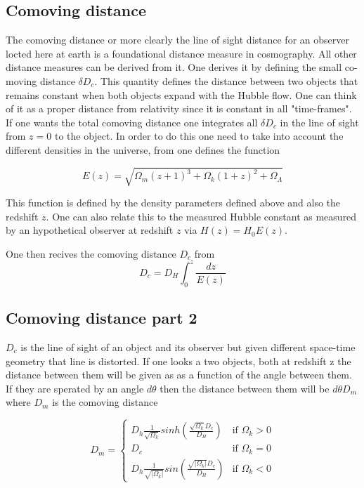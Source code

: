 \documentclass{article}
\begin{document}
\subsection{Comoving distance}
The comoving distance or more clearly the line of sight distance for an observer locted here
 at earth is a foundational distance measure in cosmography. All other distance measures can be 
 derived from it. One derives it by defining the small co-moving distance $\delta D_c$. 
 This quantity defines the distance between two objects that remains constant when both objects expand with the Hubble flow.
  One can think of it as a proper distance from relativity since it is constant in all "time-frames". 
  If one wants the total comoving distance one integrates all $\delta D_c$ in the line of sight from $z= 0$ to the object. 
In order to do this one need to take into account the different densities in the universe, from  \cite{hogg2000distance} one defines the function 

\begin{equation}
    E(z)  = \sqrt{\Omega_m(z+1)^3 +\Omega_k (1+z)^2 + \Omega_\Lambda  }
\end{equation}


This function is defined by the density parameters defined above and also the redshift $z$. 
One can also relate this to the measured Hubble constant as measured by an hypothetical observer at 
redshift $z$ via $ H(z) = H_0 E(z)$. 


One then recives the comoving distance $D_c$ from 
\begin{equation}
    D_c =D_H \int_0^z\frac{dz}{E(z)}
\end{equation}
\subsection{Comoving distance part 2}
$D_c$ is the line of sight of an object and its observer but given different space-time geometry that line 
is distorted. If one looks a two objects, both at redshift z the distance between them will be given as as a 
function of the angle between them. If they are sperated by an angle $d\theta$ then the distance between them will be $d\theta D_m$ where $D_m$ is the comoving distance


$$
D_m =
\begin{cases}
  D_h\frac{1}{\sqrt{\Omega_k}}sinh(\frac{\sqrt{\Omega_k}D_c}{D_H}) & \text{if } \Omega_k > 0 \\
  D_c& \text{if } \Omega_k = 0 \\
  D_h\frac{1}{\sqrt{|\Omega_k|}}sin(\frac{\sqrt{|\Omega_k|}D_c}{D_H}) & \text{if } \Omega_k < 0
\end{cases}
$$
\end{document}

